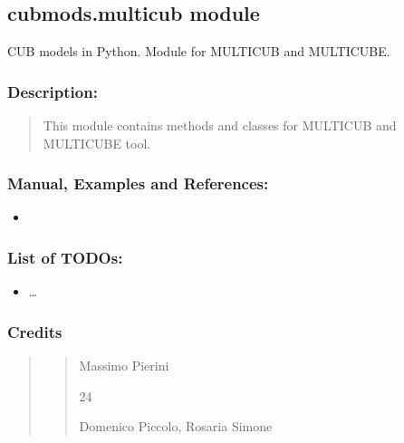 \documentclass[letterpaper,10pt,english]{sphinxmanual}
\begin{document}
\subsection{cubmods.multicub module}
\label{\detokenize{cubmods:module-cubmods.multicub}}\label{\detokenize{cubmods:cubmods-multicub-module}}\label{\detokenize{cubmods:multicub-module}}
\sphinxAtStartPar
CUB models in Python.
Module for MULTICUB and MULTICUBE.


\subsubsection{Description:}
\label{\detokenize{cubmods:id87}}\begin{quote}

\sphinxAtStartPar
This module contains methods and classes
for MULTICUB and MULTICUBE tool.
\end{quote}


\subsubsection{Manual, Examples and References:}
\label{\detokenize{cubmods:id88}}\begin{itemize}
\item {} 
\sphinxAtStartPar
{}

\end{itemize}


\subsubsection{List of TODOs:}
\label{\detokenize{cubmods:id89}}\begin{itemize}
\item {} 
\sphinxAtStartPar
…

\end{itemize}


\subsubsection{Credits}
\label{\detokenize{cubmods:id90}}\begin{quote}
\begin{quote}\begin{description}
\sphinxAtStartPar
Massimo Pierini

\sphinxhyphen{}24

\sphinxAtStartPar
Domenico Piccolo, Rosaria Simone

\sphinxAtStartPar
{}

\end{description}\end{quote}
\end{quote}
\end{document}
